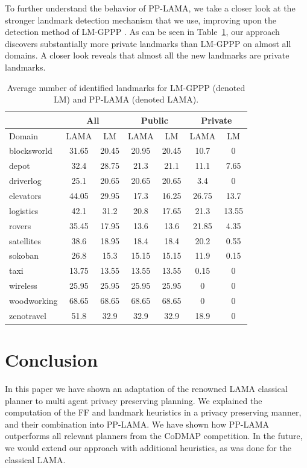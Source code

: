 \documentclass[letterpaper]{article}
\theoremstyle{definition}
\begin{document}
To further understand the behavior of PP-LAMA, we take a closer look at the stronger landmark detection mechanism that we use, improving upon the detection method of LM-GPPP \citep{maliah2015privacy}.  As can be seen in Table~\ref{tbl:landmarks}, our approach discovers substantially more private landmarks than LM-GPPP on almost all domains. A closer look reveals that almost all the new landmarks are private landmarks.

\begin{table}[t]
\scriptsize
\centering
\begin{tabular}{|l|c|c|c|c|c|c|}
\hline
			&\multicolumn{2}{c|}{All}&\multicolumn{2}{c|}{Public}&\multicolumn{2}{c|}{Private}\\ \hline
Domain		& LAMA &	LM & LAMA &	LM & LAMA&	LM  \\ \hline \hline
blocksworld	&	31.65	&	20.45	&	20.95	&	20.45	&	10.7	&	0	\\ \hline
depot	&	32.4	&	28.75	&	21.3	&	21.1	&	11.1	&	7.65	\\ \hline
driverlog	&	25.1	&	20.65	&	20.65	&	20.65	&	3.4	&	0	\\ \hline
elevators	&	44.05	&	29.95	&	17.3	&	16.25	&	26.75	&	13.7	\\ \hline
logistics	&	42.1	&	31.2	&	20.8	&	17.65	&	21.3	&	13.55	\\ \hline
rovers	&	35.45	&	17.95	&	13.6	&	13.6	&	21.85	&	4.35	\\ \hline
satellites	&	38.6	&	18.95	&	18.4	&	18.4	&	20.2	&	0.55	\\ \hline
sokoban	&	26.8	&	15.3	&	15.15	&	15.15	&	11.9	&	0.15	\\ \hline
taxi	&	13.75	&	13.55	&	13.55	&	13.55	&	0.15	&	0	\\ \hline
wireless	&	25.95	&	25.95	&	25.95	&	25.95	&	0	&	0	\\ \hline
woodworking	&	68.65	&	68.65	&	68.65	&	68.65	&	0	&	0	\\ \hline
zenotravel	&	51.8	&	32.9	&	32.9	&	32.9	&	18.9	&	0	\\ \hline
\end{tabular}
\caption{Average number of identified landmarks for LM-GPPP (denoted LM) and PP-LAMA (denoted LAMA).}
\label{tbl:landmarks}
\end{table}


\section{Conclusion}
In this paper we have shown an adaptation of the renowned LAMA classical planner to multi agent privacy preserving planning. We explained the computation of the FF and landmark heuristics in a privacy preserving manner, and their combination into PP-LAMA. We have shown how PP-LAMA outperforms all relevant planners from the CoDMAP competition. In the future, we would extend our approach with additional heuristics, as was done for the classical LAMA.


\pagebreak


\end{document}
